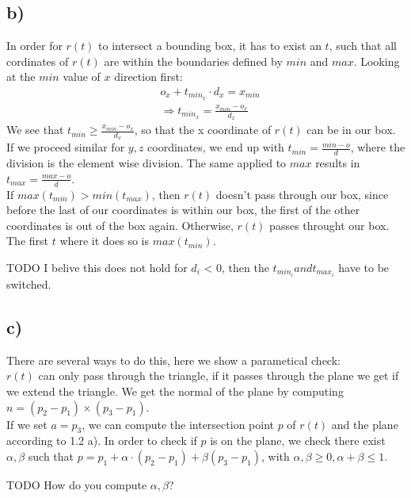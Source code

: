 \documentclass[a4paper]{scrartcl}
\begin{document}
    \subsection*{b)}
        In order for $r(t)$ to intersect a bounding box, it has to exist an $t$,
        such that all cordinates of $r(t)$ are within the boundaries defined by
        $min$ and $max$. Looking at the $min$ value of $x$ direction first:\\
        \begin{align*}
            & o_x + t_{min_x} \cdot d_x = x_{min}\\
            &\Rightarrow t_{min_x}=\frac{x_{min}-o_x }{d_x }
        \end{align*}
        We see that $t_{min}\geq\frac{x_{min}-o_x }{d_x }$, so that the x
        coordinate of $r(t)$ can be in our box. If we proceed similar for $y,z$
        coordinates, we end up with $t_{min}=\frac{min-o}{d}$, where the
        division is the element wise division. The same applied to $max$ results
        in $t_{max}=\frac{max-o}{d}$.\\
        If $max(t_{min}) > min(t_{max})$, then $r(t)$ doesn't pass through our
        box, since before the last of our coordinates is within our box, the
        first of the other coordinates is out of the box again. Otherwise,
        $r(t)$ passes throught our box. The first $t$ where it does so is
        $max(t_{min})$.

        TODO I belive this does not hold for $d_i$ < 0, then the $t_{min_i} and t_{max_i}$ have to be switched.


    \subsection*{c)}
        There are several ways to do this, here we show a parametical check:\\
        $r(t)$ can only pass through the triangle, if it passes through the
        plane we get if we extend the triangle. We get the normal of the plane
        by computing $n=(p_2 - p_1)\times (p_3 - p_1)$.\\
        If we set $a=p_3$, we can compute the intersection point $p$ of $r(t)$
        and the plane according to 1.2 a). In order to check if $p$ is on the
        plane, we check there exist $\alpha , \beta$ such that $p=p_1 + \alpha
        \cdot (p_2 - p_1 ) + \beta (p_3 - p_1 )$, with $\alpha , \beta \geq 0,
        \alpha + \beta \leq 1$.

        TODO How do you compute $\alpha, \beta$?
\end{document}
